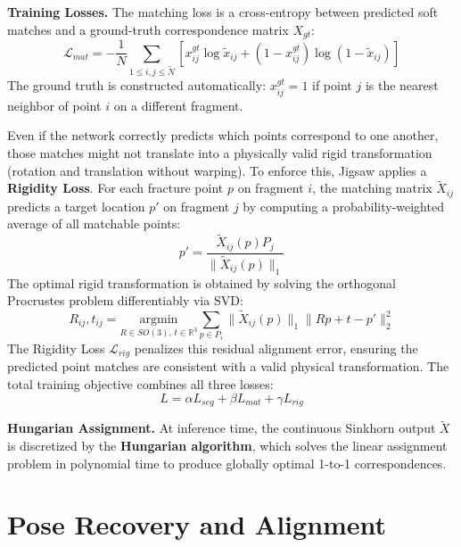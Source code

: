 \textbf{Training Losses.} The matching loss is a cross-entropy between predicted soft matches and a ground-truth correspondence matrix \(X_{gt}\):
\begin{equation}
\label{eq:mat_loss}
\mathcal{L}_{mat} =
-\frac{1}{N}
\sum_{1 \le i,j \le \tilde{N}}
\left[
x_{ij}^{gt} \log \tilde{x}_{ij}
+
(1 - x_{ij}^{gt}) \log(1 - \tilde{x}_{ij})
\right]
\end{equation}
The ground truth is constructed automatically: \(x_{ij}^{gt} = 1\) if point \(j\) is the nearest neighbor of point \(i\) on a different fragment.

Even if the network correctly predicts which points correspond to one another, those matches might not translate into a physically valid rigid transformation (rotation and translation without warping). To enforce this, Jigsaw applies a \textbf{Rigidity Loss}. For each fracture point \(p\) on fragment \(i\), the matching matrix \(\tilde{X}_{ij}\) predicts a target location \(p'\) on fragment \(j\) by computing a probability-weighted average of all matchable points:
\begin{equation}
\label{eq:target_location}
p' = \frac{\tilde{X}_{ij}(p) P_j}{\|\tilde{X}_{ij}(p)\|_1}
\end{equation}
The optimal rigid transformation is obtained by solving the orthogonal Procrustes problem differentiably via SVD:
\begin{equation}
    \label{eq:procrustes}
    R_{ij}, t_{ij} =
    \underset{R \in SO(3),\, t \in \mathbb{R}^3}{\text{argmin}}
    \sum_{p \in P_i}
    \|\tilde{X}_{ij}(p)\|_1
    \|Rp + t - p'\|_2^2
\end{equation}
The Rigidity Loss \(\mathcal{L}_{rig}\) penalizes this residual alignment error, ensuring the predicted point matches are consistent with a valid physical transformation. The total training objective combines all three losses:
\begin{equation}
\label{eq:total_loss}
L = \alpha L_{seg} + \beta L_{mat} + \gamma L_{rig}
\end{equation}

\textbf{Hungarian Assignment.} At inference time, the continuous Sinkhorn output \(\tilde{X}\) is discretized by the \textbf{Hungarian algorithm}, which solves the linear assignment problem in polynomial time to produce globally optimal 1-to-1 correspondences.

\section{Pose Recovery and Alignment}
